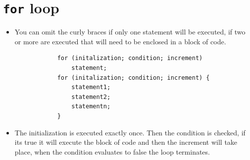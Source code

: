 \section{\texttt{for} loop}
\begin{itemize}
    \item You can omit the curly braces if only one statement will be executed, if two or more are executed that will need to be enclosed in a block of code.
        \begin{verbatim}
            for (initalization; condition; increment)
                statement;
            for (initalization; condition; increment) {
                statement1;
                statement2;
                statementn;
            }
        \end{verbatim}
    
    \item The initialization is executed exactly once. Then the condition is checked, if its true it will execute the block of code and then the increment will take place, when the condition evaluates to false the loop terminates.
\end{itemize}

